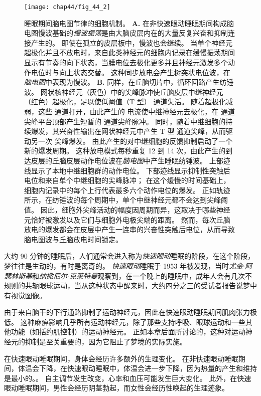 \begin{figure}[htbp]
	\centering
	\texttt{[image: chap44/fig\_44\_2]}
	\caption{睡眠期间脑电图节律的细胞机制。
		\textbf{A.} 在非快速眼动睡眠期间构成脑电图慢波基础的\textit{慢波振荡}是由大脑皮层内在的大量反复兴奋和抑制连接产生的。
		即使在孤立的皮层板中，慢波也会继续。
		当单个神经元超极化并且不放电时，来自此类神经元的细胞内记录在缓慢振荡期间显示有节奏的向下状态，当膜电位去极化更多并且神经元激发多个动作电位时与向上状态交替。
		这种同步放电会产生树突状电位波，在\textit{脑电图}中表现为慢波。
		\textbf{B.} 同样，在丘脑切片中，循环回路产生纺锤波。
		网状核神经元（灰色）中的尖峰脉冲使丘脑皮层中继神经元（红色）超极化，足以使低阈值（T 型） 通道失活。
		随着超极化减弱，这些  通道打开，由此产生的  电流使中继神经元去极化，在  通道尖峰平台顶部产生短暂的  通道尖峰脉冲。
		同时，随着中继细胞的持续爆发，其兴奋性输出在网状神经元中产生 T 型  通道尖峰，从而驱动另一次  尖峰爆发。
		由此产生的对中继细胞的反馈抑制启动了一个新的爆发周期。
		这种放电模式每秒重复 12 到 14 次，由此产生的到达皮层的丘脑皮层动作电位波在\textit{脑电图}中产生睡眠纺锤波。
		上部迹线显示了本地中继细胞群的动作电位。
		下部迹线显示抑制性突触后电位和来自单个中继细胞的尖峰脉冲； 在这个缓慢的时间基础上，细胞内记录中的每个上行代表最多六个动作电位的爆发。
		正如轨迹所示，在纺锤波的每个周期中，单个中继神经元都不会达到尖峰阈值。
		因此，细胞外尖峰活动的幅度因周期而异，这取决于哪些神经元恰好被激发以及它们与细胞外电极尖端的距离。
		然而，每次丘脑放电的爆发都会在皮层中产生一连串的兴奋性突触后电位，从而导致脑电图波与丘脑放电时间锁定\cite{bal1995synaptic}。}
	\label{fig:44_2}
\end{figure}


大约 90 分钟的睡眠后，人们通常会进入称为\textit{快速眼动}睡眠的阶段，在这个阶段，梦往往是生动的，有时是离奇的。
\textit{快速眼动}睡眠于 1953 年被发现，当时\textit{尤金$\cdot$阿瑟林斯基}和\textit{纳撒尼尔$\cdot$克莱特曼}观察到，在一个晚上的睡眠中，成年人会有几次不规则的共轭眼球运动，当从这种状态中醒来时，大约四分之三的受试者报告说梦中有视觉图像。


由于来自脑干的下行通路抑制了运动神经元，因此在快速眼动睡眠期间肌肉张力极低。
这种麻痹影响几乎所有运动神经元，除了那些支持呼吸、眼球运动和一些其他功能（如括约肌控制）的运动神经元。
正如本章后面所讨论的，这种对运动神经元的抑制是至关重要的，因为它阻止了梦境的实际实施。


在快速眼动睡眠期间，身体会经历许多额外的生理变化。
在非快速眼动睡眠期间，体温会下降，在快速眼动睡眠中，体温会进一步下降，因为热量的产生和维持是最小的。。
自主调节发生改变，心率和血压可能发生巨大变化。
此外，在快速眼动睡眠期间，男性会经历阴茎勃起，而女性会经历性唤起的生理迹象。


